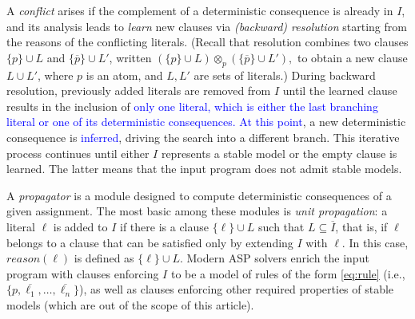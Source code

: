 \documentclass[preprint,authoryear]{elsarticle}
\theoremstyle{definition}
\begin{document}
%
A \emph{conflict} arises if the complement of a deterministic consequence is already in $I$, and its analysis leads to \emph{learn} new clauses via \emph{(backward) resolution} starting from the reasons of the conflicting literals. 
(Recall that resolution combines two clauses 
$\{p\} \cup L$ and $\{\overline{p}\} \cup L'$, written $(\{p\} \cup L)\otimes_p(\{\overline{p}\} \cup L'),$ to obtain a new clause $L \cup L'$, where $p$ is an atom, and $L,L'$ are sets of literals.)
During backward resolution, previously added literals are removed from $I$ until the learned clause results in the inclusion of \textcolor{blue}{only one literal, which is either the last branching literal or one of its deterministic consequences. At this point}, a new deterministic consequence is \textcolor{blue}{inferred}, driving the search into a different branch.
%
This iterative process continues until either $I$ represents a stable model or the empty clause is learned. The latter means that the input program does not admit stable models.

A \emph{propagator} is a module designed to compute deterministic consequences of a given assignment.
The most basic among these modules is \emph{unit propagation}:
a literal $\ell$ is added to $I$ if there is a clause $\{\ell\} \cup L$ such that $L \subseteq \overline{I}$, that is, if $\ell$ belongs to a clause that can be satisfied only by extending $I$ with $\ell$.
In this case, $\mathit{reason}(\ell)$ is defined as $\{\ell\} \cup L$.
%
Modern ASP solvers enrich the input program with clauses enforcing $I$ to be a model of rules of the form \eqref{eq:rule} (i.e., $\{p, \overline{\ell_1}, \ldots, \overline{\ell_n}\}$), as well as clauses enforcing other required properties of stable models (which are out of the scope of this article).
\end{document}
